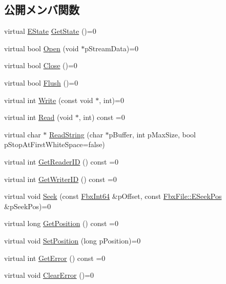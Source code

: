 \subsection*{公開メンバ関数}
\begin{DoxyCompactItemize}
\item 
virtual \hyperlink{class_fbx_stream_adc469d38eb30339fa4190eb6c66ec8f7}{E\+State} \hyperlink{class_fbx_stream_a602172d138a0fc5c4cb3443b2b925296}{Get\+State} ()=0
\item 
virtual bool \hyperlink{class_fbx_stream_ab8b3c6e904344c1b1d74e457ae8a74e7}{Open} (void $\ast$p\+Stream\+Data)=0
\item 
virtual bool \hyperlink{class_fbx_stream_a6779ab0ccbe8e14e5cf5cf47f5206519}{Close} ()=0
\item 
virtual bool \hyperlink{class_fbx_stream_a9174d1c9a10e7f0f6f283c6b7f9a1dce}{Flush} ()=0
\item 
virtual int \hyperlink{class_fbx_stream_a0bd0142e0acd244bc4342381c28b7a9a}{Write} (const void $\ast$, int)=0
\item 
virtual int \hyperlink{class_fbx_stream_a2621d456bfda1f0e4e3492bcc81ec2e6}{Read} (void $\ast$, int) const =0
\item 
virtual char $\ast$ \hyperlink{class_fbx_stream_a9c72065cd571b54b1cbcd6dfa89adb32}{Read\+String} (char $\ast$p\+Buffer, int p\+Max\+Size, bool p\+Stop\+At\+First\+White\+Space=false)
\item 
virtual int \hyperlink{class_fbx_stream_ae2a7513a648cde508d00f5172ba2843d}{Get\+Reader\+ID} () const =0
\item 
virtual int \hyperlink{class_fbx_stream_af39d714bf396c28252772b5d8e7caa47}{Get\+Writer\+ID} () const =0
\item 
virtual void \hyperlink{class_fbx_stream_a00041c3874c430a77fb7e69a9adc894f}{Seek} (const \hyperlink{fbxtypes_8h_ac7e1334c7c6aacc9c8a9dccddebb4368}{Fbx\+Int64} \&p\+Offset, const \hyperlink{class_fbx_file_aba91fe59f9c0a4c84a92f13c0c27deec}{Fbx\+File\+::\+E\+Seek\+Pos} \&p\+Seek\+Pos)=0
\item 
virtual long \hyperlink{class_fbx_stream_aa63da9f62321748910acaa808322a794}{Get\+Position} () const =0
\item 
virtual void \hyperlink{class_fbx_stream_aeb8843a4daec9d82187cc3eea5bb9baa}{Set\+Position} (long p\+Position)=0
\item 
virtual int \hyperlink{class_fbx_stream_adec0d602a55d05e923980e048b8d5b54}{Get\+Error} () const =0
\item 
virtual void \hyperlink{class_fbx_stream_ad90dfab257677bb8cd62efb9d65d3a02}{Clear\+Error} ()=0

\end{DoxyCompactItemize}
